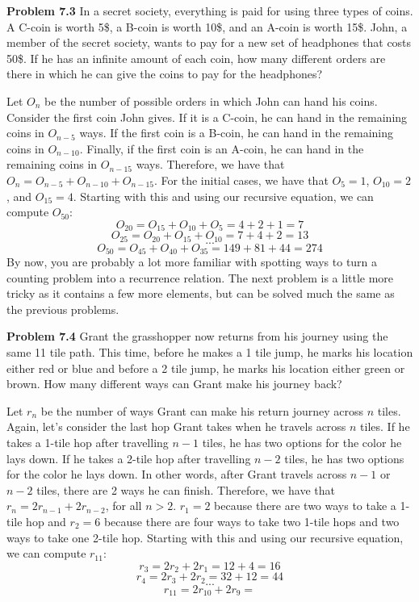 \documentclass[11pt]{scrartcl}
\begin{document}
\begin{tcolorbox}
\textbf{Problem 7.3} In a secret society, everything is paid for using three types of coins. A C-coin is worth 5\$, a B-coin is worth 10\$, and an A-coin is worth 15\$. John, a member of the secret society, wants to pay for a new set of headphones that costs 50\$. If he has an infinite amount of each coin, how many different orders are there in which he can give the coins to pay for the headphones? 
\end{tcolorbox}
\noindent 
Let $O_n$ be the number of possible orders in which John can hand his coins. Consider the first coin John gives. If it is a C-coin, he can hand in the remaining coins in $O_{n-5}$ ways. If the first coin is a B-coin, he can hand in the remaining coins in $O_{n-10}$. Finally, if the first coin is an A-coin, he can hand in the remaining coins in $O_{n-15}$ ways. Therefore, we have that ${O_n}=O_{n-5}+O_{n-10}+O_{n-15}$. For the initial cases, we have that ${O_5}=1$, ${O_{10}}=2$, and ${O_{15}}=4$. Starting with this and using our recursive equation, we can compute $O_{50}$:
$${O_{20}}={O_{15}}+{O_{10}}+{O_{5}}=4+2+1=7$$
$${O_{25}}={O_{20}}+{O_{15}}+{O_{10}}=7+4+2=13$$
$$...$$
$${O_{50}}={O_{45}}+{O_{40}}+{O_{35}}=149+81+44=274$$
\noindent
By now, you are probably a lot more familiar with spotting ways to turn a counting problem into a recurrence relation. The next problem is a little more tricky as it contains a few more elements, but can be solved much the same as the previous problems. 
\\
\begin{tcolorbox}
\textbf{Problem 7.4} Grant the grasshopper now returns from his journey using the same 11 tile path. This time, before he makes a 1 tile jump, he marks his location either red or blue and before a 2 tile jump, he marks his location either green or brown. How many different ways can Grant make his journey back?
\end{tcolorbox}
\noindent 
Let $r_n$ be the number of ways Grant can make his return journey across $n$ tiles. Again, let's consider the last hop Grant takes when he travels across $n$ tiles. If he takes a 1-tile hop after travelling $n-1$ tiles, he has two options for the color he lays down. If he takes a 2-tile hop after travelling $n-2$ tiles, he has two options for the color he lays down. In other words, after Grant travels across $n-1$ or $n-2$ tiles, there are 2 ways he can finish. Therefore, we have that ${r_n}=2{r_{n-1}+2{r_{n-2}}}$, for all $n > 2$. ${r_1}=2$ because there are two ways to take a 1-tile hop and ${r_2}=6$ because there are four ways to take two 1-tile hops and two ways to take one 2-tile hop. Starting with this and using our recursive equation, we can compute $r_{11}$:
$${r_3}=2{r_2}+2{r_1}=12+4=16$$
$${r_4}=2{r_3}+2{r_2}=32+12=44$$
$$...$$
$${r_{11}}=2{r_{10}}+2{r_9}= $$
\end{document}
